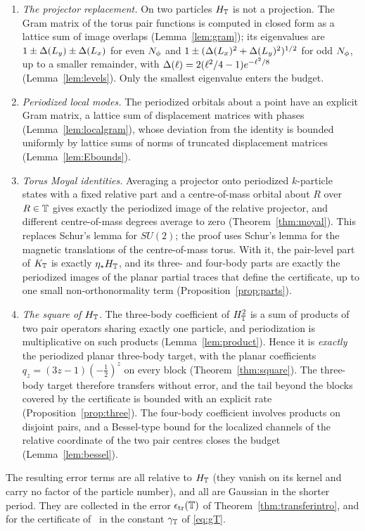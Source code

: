 \begin{enumerate}[(1)]
\item \emph{The projector replacement.} On two particles $H_{\mathbb{T}}$ is not a projection. The Gram matrix of the torus pair functions is
computed in closed form as a lattice sum of image overlaps (Lemma~\ref{lem:gram}); its eigenvalues are
$1\pm\Delta(L_y)\pm\Delta(L_x)$ for even $N_{\phi}$ and $1\pm(\Delta(L_x)^2+\Delta(L_y)^2)^{1/2}$ for odd $N_{\phi}$, up to a smaller remainder, with
$\Delta(\ell)=2(\ell^2/4-1)e^{-\ell^2/8}$ (Lemma~\ref{lem:levels}). Only the smallest eigenvalue enters the budget.
\item \emph{Periodized local modes.} The periodized orbitals about a point have an explicit Gram matrix, a lattice sum of
displacement matrices with phases (Lemma~\ref{lem:localgram}), whose deviation from the identity is bounded uniformly by lattice
sums of norms of truncated displacement matrices (Lemma~\ref{lem:Ebounds}).
\item \emph{Torus Moyal identities.} Averaging a projector onto periodized $k$-particle states with a fixed relative part and a
centre-of-mass orbital about $R$ over $R\in\mathbb{T}$ gives exactly the periodized image of the relative projector, and different
centre-of-mass degrees average to zero (Theorem~\ref{thm:moyal}). This replaces Schur's lemma for $SU(2)$; the proof uses Schur's
lemma for the magnetic translations of the centre-of-mass torus. With it, the pair-level part of $K_{\mathbb{T}}$ is exactly $\eta_{*}H_{\mathbb{T}}$, and
its three- and four-body parts are exactly the periodized images of the planar partial traces that define the certificate,
up to one small non-orthonormality term (Proposition~\ref{prop:parts}).
\item \emph{The square of $H_{\mathbb{T}}$.} The three-body coefficient of $H_{\mathbb{T}}^2$ is a sum of products of two pair operators sharing exactly
one particle, and periodization is multiplicative on such products (Lemma~\ref{lem:product}). Hence it is \emph{exactly} the
periodized planar three-body target, with the planar coefficients $q_z=(3z-1)(-\frac12)^z$ on every block
(Theorem~\ref{thm:square}). The three-body target therefore transfers without error, and the tail beyond the blocks covered by
the certificate is bounded with an explicit rate (Proposition~\ref{prop:three}). The four-body coefficient involves products on
disjoint pairs, and a Bessel-type bound for the localized channels of the relative coordinate of the two pair centres closes
the budget (Lemma~\ref{lem:bessel}).
\end{enumerate}
The resulting error terms are all relative to $H_{\mathbb{T}}$ (they vanish on its kernel and carry no factor of the particle number), and all
are Gaussian in the shorter period. They are collected in the error $\epsilon_{\mathrm{tr}}(\mathbb{T})$ of Theorem~\ref{thm:transferintro}, and for the
certificate of~\cite{OAI:A-Fock-space-inequality-and-the-Laughlin-spectral-gap-September-24-2026} in the constant $\gamma_{\mathbb{T}}$
of \eqref{eq:gT}.

